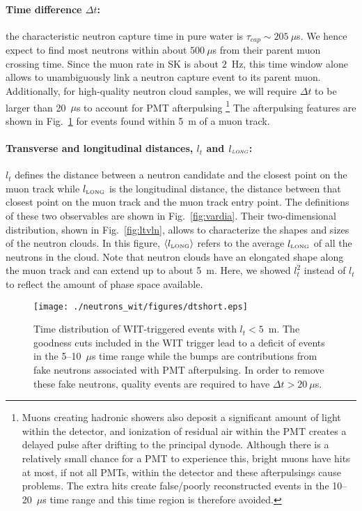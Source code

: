 \paragraph{Time difference $\Delta t$:} the characteristic neutron capture time in pure water is $\tau_{cap}{\sim}205~\mu$s. We hence expect to find most neutrons within about $500~\mu$s from their parent muon crossing time. Since the muon rate in SK is about $2$~Hz, this time window alone allows to unambiguously link a neutron capture event to its parent muon. Additionally, for high-quality neutron cloud samples, we will require $\Delta t$ to be larger than 20~$\mu$s to account for PMT afterpulsing \footnote{Muons creating hadronic showers also deposit a significant amount of light within the detector, and ionization of residual air within the PMT creates a delayed pulse after drifting to the principal dynode. Although there is a relatively small chance for a PMT to experience this, bright muons have hits at most, if not all PMTs, within the detector and these afterpulsings cause problems. The extra hits create false/poorly reconstructed events in the 10--20~$\mu$s time range and this time region is therefore avoided.} The afterpulsing features are shown in Fig.~\ref{fig:afterpulsing} for events found within 5~m of a muon track.

\paragraph{Transverse and longitudinal distances, $l_t$ and $l_{\mbox{\tiny \it LONG}}$: }  $l_t$ defines the distance between a neutron candidate and the closest point on the muon track while $l_{\mbox{\tiny LONG}}$ is the longitudinal distance, the distance between that closest point on the muon track and the muon track entry point. The definitions of these two observables are shown in Fig.~\ref{fig:vardia}. Their two-dimensional distribution, shown in Fig.~\ref{fig:ltvln}, allows to characterize the shapes and sizes of the neutron clouds. In this figure, $\langle l_{\mbox{\tiny LONG}}\rangle$ refers to the average $l_{\mbox{\tiny LONG}}$ of all the neutrons in the cloud. Note that neutron clouds have an elongated shape along the muon track and can extend up to about 5~m. Here, we showed $l_t^2$ instead of $l_t$ to reflect the amount of phase space available.



\begin{figure}
    \centering
    \texttt{[image: ./neutrons\_wit/figures/dtshort.eps]}
    \caption{Time distribution of WIT-triggered events with $l_t < 5$~m. The goodness cuts included in the WIT trigger lead to a deficit of events in the 5--10~$\mu$s time range while the bumps are contributions from fake neutrons associated with PMT afterpulsing. In order to remove these fake neutrons, quality events are required to have $\Delta t > 20~\mu$s.}
    \label{fig:afterpulsing}
\end{figure}

